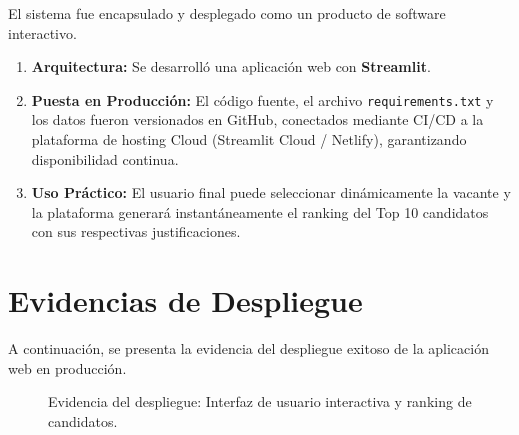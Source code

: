 \documentclass[11pt]{article}
\begin{document}
El sistema fue encapsulado y desplegado como un producto de software interactivo.

\begin{enumerate}[label=\textbf{\arabic*.}]
    \item \textbf{Arquitectura:} Se desarrolló una aplicación web con \textbf{Streamlit}.
    \item \textbf{Puesta en Producción:} El código fuente, el archivo \texttt{requirements.txt} y los datos fueron versionados en GitHub, conectados mediante CI/CD a la plataforma de hosting Cloud (Streamlit Cloud / Netlify), garantizando disponibilidad continua.
    \item \textbf{Uso Práctico:} El usuario final puede seleccionar dinámicamente la vacante y la plataforma generará instantáneamente el ranking del Top 10 candidatos con sus respectivas justificaciones.
\end{enumerate}

\section*{Evidencias de Despliegue}

A continuación, se presenta la evidencia del despliegue exitoso de la aplicación web en producción.

\begin{figure}[H]
    \centering
    \caption{Evidencia del despliegue: Interfaz de usuario interactiva y ranking de candidatos.}
\end{figure}
\end{document}
